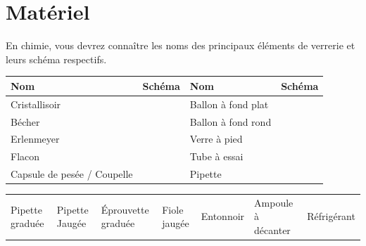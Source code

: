 \documentclass[a4paper,11pt,fleqn]{article}%
\begin{document}
\section{Matériel}
En chimie, vous devrez connaître les noms des principaux éléments de verrerie et leurs schéma respectifs.
\renewcommand{\arraystretch}{4}
\begin{table}[h!]
	\begin{tabular}{|>{\centering}m{3cm}|>{\centering}m{5.5cm}||>{\centering}m{3cm}|>{\centering\arraybackslash}m{5.5cm}|}
	\hline
	\textbf{Nom} & \textbf{Schéma} & \textbf{Nom} & \textbf{Schéma}\\ \hline
	Cristallisoir & & Ballon à fond plat & \\ \hline
	Bécher & & Ballon à fond rond & \\ \hline
	Erlenmeyer & & Verre à pied & \\ \hline
	Flacon & & Tube à essai & \\ \hline
	Capsule de pesée / Coupelle & & Pipette & \\ \hline
	\end{tabular}
\end{table}
\vspace{1em}

\begin{table}[h!]
\begin{tabular}{|>{\centering}m{2.3cm}|>{\centering}m{2.2cm}|>{\centering}m{2.3cm}|>{\centering}m{2.3cm}|>{\centering}m{2.2cm}|>{\centering}m{2.2cm}|>{\centering\arraybackslash}m{2.2cm}|}
	\hline
	&&&&&&\rule[5cm]{0cm}{0cm}\\ \hline
	Pipette graduée & Pipette Jaugée & Éprouvette graduée & Fiole jaugée & Entonnoir & Ampoule à décanter & Réfrigérant \\ \hline 
\end{tabular}
\end{table}
\end{document}
